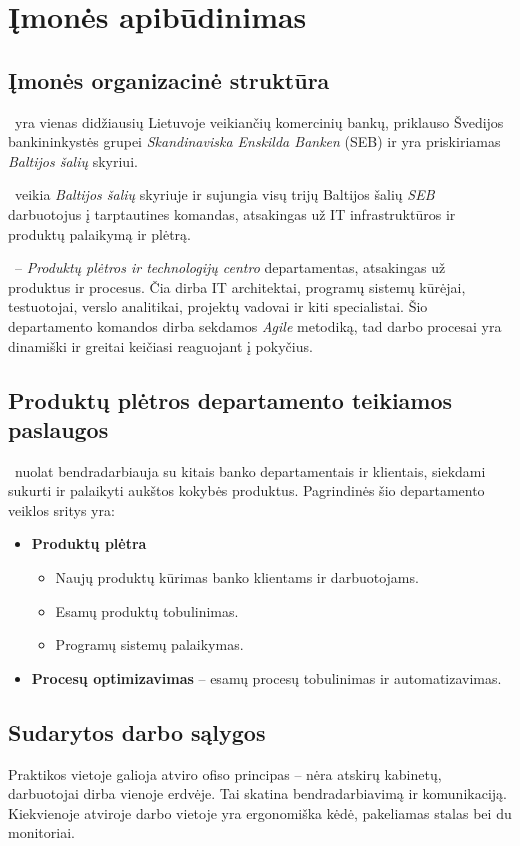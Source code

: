 \section{Įmonės apibūdinimas}

\subsection{Įmonės organizacinė struktūra}
\SEB~yra vienas didžiausių Lietuvoje veikiančių komercinių bankų, priklauso Švedijos bankininkystės grupei \textit{Skandinaviska Enskilda Banken} (SEB) ir yra priskiriamas \textit{Baltijos šalių} skyriui. 

\PDT~veikia \textit{Baltijos šalių} skyriuje ir sujungia visų trijų Baltijos šalių \textit{SEB} darbuotojus į tarptautines komandas, atsakingas už IT infrastruktūros ir produktų palaikymą ir plėtrą.

\PD~-- \textit{Produktų plėtros ir technologijų centro} departamentas, atsakingas už produktus ir procesus. Čia dirba IT architektai, programų sistemų kūrėjai, testuotojai, verslo analitikai, projektų vadovai ir kiti specialistai. Šio departamento komandos dirba sekdamos \textit{Agile} \cite{cohenIntroductionAgileMethods2004} metodiką, tad darbo procesai yra dinamiški ir greitai keičiasi reaguojant į pokyčius.

\subsection{Produktų plėtros departamento teikiamos paslaugos}

\PD~nuolat bendradarbiauja su kitais banko departamentais ir klientais, siekdami sukurti ir palaikyti aukštos kokybės produktus. Pagrindinės šio departamento veiklos sritys yra:
\begin{itemize}
    \item \textbf{Produktų plėtra}
    \begin{itemize}
        \item Naujų produktų kūrimas banko klientams ir darbuotojams.
        \item Esamų produktų tobulinimas.
        \item Programų sistemų palaikymas.
    \end{itemize}
    \item \textbf{Procesų optimizavimas} -- esamų procesų tobulinimas ir automatizavimas.
\end{itemize}

\subsection{Sudarytos darbo sąlygos}
Praktikos vietoje galioja atviro ofiso  principas -- nėra atskirų kabinetų, darbuotojai dirba vienoje erdvėje. Tai skatina bendradarbiavimą ir komunikaciją. Kiekvienoje atviroje darbo vietoje yra ergonomiška kėdė, pakeliamas stalas bei du monitoriai.